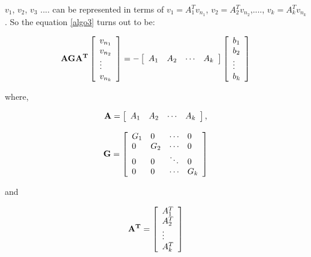 \documentclass[10pt,psfig,letterpaper,twocolumn]{article}
\begin{document}
$v_{1}$, $v_{2}$, $v_{3}$ .... can be represented in terms of $v_{1}=A_{1}^{T}v_{n_{1}}$,
$v_{2}=A_{2}^{T}v_{n_{2}}$,...., $v_{k}=A_{k}^{T}v_{n_{k}}$. So the equation \ref{algo3} turns 
out to be:

\begin{equation}
\bf{AGA^{T}}
\left[\begin{array}{l}
v_{n_{1}}\\
v_{n_{2}}\\
{\vdots}\\
v_{n_{k}}\\
\end{array}\right] = - 
\left[\begin{array}{llll}  
A_{1} & A_{2} & {\cdots} & A_{k}
\end{array}\right]
\left[\begin{array}{l}
b_{1}\\
b_{2}\\
{\vdots}\\
b_{k}\\
\end{array}\right]
\label{algo4}
\end{equation}


where,\par
$$ {\bf {A}} = \left[\begin{array}{llll}
A_{1} & A_{2} &{\cdots} & A_{k}
\end{array}\right],$$ \par
$$ {\bf {G}} = \left[\begin{array}{llll}
G_{1} &  0 & {\cdots} & 0\\ 
0  & G_{2} & {\cdots} & 0\\ 
0 & 0 & {\ddots} & 0\\ 
0 & 0 & {\cdots} & G_{k}\\ 
\end{array}\right] $$ \par
and \par
$$ {\bf {A^{T}}} =
\left[\begin{array}{l}
A_{1}^{T}\\
A_{2}^{T}\\
{\vdots}\\
A_{k}^{T}\\
\end{array}\right] $$
\end{document}

